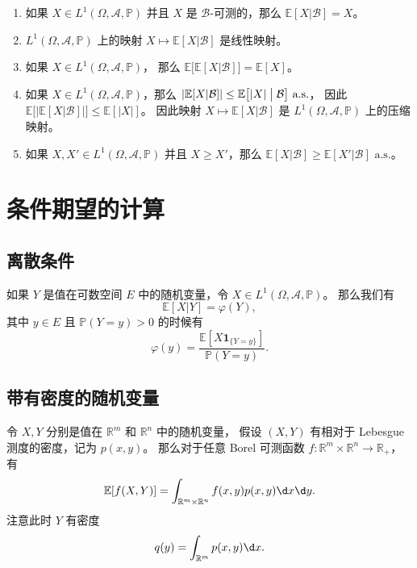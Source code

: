 \documentclass[fontset=none]{Notes}
\newcommand{\indicator}[1]{\mathbold 1_{#1}}
\newcommand{\alsu}[1]{\text{$#1$ a.s.}}
\begin{document}
\begin{proposition}[条件期望的性质]
  \mbox{}
  \begin{enumerate}
    \item 如果 $X\in L^1(\Omega,\mathcal{A},\mathbb{P})$
    并且 $X$ 是 $\mathcal{B}$-可测的，那么
    $\mathbb{E}[X|\mathcal{B}]=X$。
    \item $L^1(\Omega,\mathcal{A},\mathbb{P})$
    上的映射 $X\mapsto \mathbb{E}[X| \mathcal{B}]$
    是线性映射。
    \item 如果 $X\in L^1(\Omega,\mathcal{A},\mathbb{P})$，
    那么 $\mathbb{E}\bigl[\mathbb{E}[X| \mathcal{B}]\bigr]=\mathbb{E}[X]$。
    \item 如果 $X\in L^1(\Omega,\mathcal{A},\mathbb{P})$，那么
    $|\mathbb{E}[X|\mathcal{B}]|\leq \mathbb{E}\bigl[|X|\bigm| \mathcal{B}\bigr]\alsu{}$，
    因此 $\mathbb{E}\bigl[\bigl|\mathbb{E}[X|\mathcal{B}]\bigr|\bigr]\leq \mathbb{E}[|X|]$。
    因此映射 $X\mapsto \mathbb{E}[X|\mathcal{B}]$ 是 $L^1(\Omega,\mathcal{A},\mathbb{P})$
    上的压缩映射。
    \item 如果 $X,X'\in L^1(\Omega,\mathcal{A},\mathbb{P})$ 并且
    $X\geq X'$，那么 $\mathbb{E}[X|\mathcal{B}]\geq \mathbb{E}[X'|\mathcal{B}]\alsu{}$。
  \end{enumerate}
\end{proposition}

\section{条件期望的计算}

\subsection{离散条件}

如果 $Y$ 是值在可数空间 $E$ 中的随机变量，令 $X\in L^1(\Omega,\mathcal{A},\mathbb{P})$。
那么我们有
\[
  \mathbb{E}[X|Y]=\varphi(Y),  
\]
其中 $y\in E$ 且 $\mathbb{P}(Y=y)>0$ 的时候有
\[
  \varphi(y)=\frac{\mathbb{E}[X\indicator{\{Y=y\}}]}{\mathbb{P}(Y=y)}.
\]

\subsection{带有密度的随机变量}

令 $X,Y$ 分别是值在 $\mathbb{R}^m$ 和 $\mathbb{R}^n$ 中的随机变量，
假设 $(X,Y)$ 有相对于 Lebesgue 测度的密度，记为 $p(x,y)$。
那么对于任意 Borel 可测函数 $f:\mathbb{R}^m\times \mathbb{R}^n\to \mathbb{R}_+$，有
\[
  \mathbb{E}[f(X,Y)]=\int_{\mathbb{R}^m\times \mathbb{R}^n}
  f(x,y)p(x,y)\d x\d y.  
\]
注意此时 $Y$ 有密度
\[
  q(y)=\int_{\mathbb{R}^m}p(x,y)\d x.
\]
\end{document}

